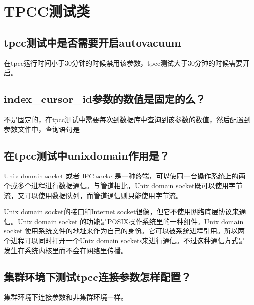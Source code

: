 \documentclass[a4,10pt,oneside,english]{sphinxmanual}
\begin{document}
\chapter{TPCC测试类}
\label{\detokenize{TPCC-test:tpcc}}\label{\detokenize{TPCC-test::doc}}

\section{tpcc测试中是否需要开启autovacuum}
\label{\detokenize{TPCC-test:tpccautovacuum}}
在tpcc运行时间小于30分钟的时候禁用该参数，tpcc测试大于30分钟的时候需要开启。


\section{index\_cursor\_id参数的数值是固定的么？}
\label{\detokenize{TPCC-test:index-cursor-id}}
不是固定的，在tpcc测试中需要每次到数据库中查询到该参数的数值，然后配置到参数文件中，查询语句是

\begin{sphinxVerbatim}[commandchars=\\\{\}]
      
\end{sphinxVerbatim}


\section{在tpcc测试中unixdomain作用是？}
\label{\detokenize{TPCC-test:tpccunixdomain}}
Unix domain socket 或者 IPC socket是一种终端，可以使同一台操作系统上的两个或多个进程进行数据通信。与管道相比，Unix domain socket既可以使用字节流，又可以使用数据队列，而管道通信则只能使用字节流。

Unix domain socket的接口和Internet socket很像，但它不使用网络底层协议来通信。Unix domain socket 的功能是POSIX操作系统里的一种组件。Unix domain socket 使用系统文件的地址来作为自己的身份。它可以被系统进程引用。所以两个进程可以同时打开一个Unix domain sockets来进行通信。不过这种通信方式是发生在系统内核里而不会在网络里传播。


\section{集群环境下测试tpcc连接参数怎样配置？}
\label{\detokenize{TPCC-test:id1}}
集群环境下连接参数和非集群环境一样。
\end{document}
